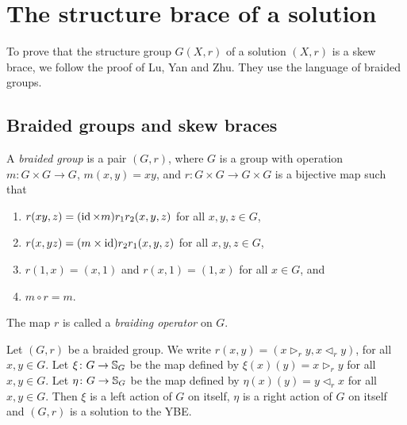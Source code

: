 \chapter{The structure brace of a solution}
\label{structure_brace}


To prove that the structure group $G(X,r)$ of a solution $(X,r)$ is a skew brace, we follow the 
proof of Lu, Yan and Zhu. They use the language of braided groups.

\section{Braided groups and skew braces}

\begin{definition}\label{braidedgroup}
A \emph{braided group} is a pair $(G,r)$, where 
$G$ is a group with operation $m\colon G\times G\to G$, $m(x,y)=xy$, and 
$r\colon G\times G\to G\times G$ is a bijective map such that
\begin{enumerate}
\item $r(xy,z)=(\operatorname{id}\times m)r_1r_2(x,y,z)$ for all $x,y,z\in G$,
\item $r(x,yz)=(m\times\operatorname{id})r_2r_1(x,y,z)$ for all $x,y,z\in G$,
\item $r(1,x)=(x,1)$ and $r(x,1)=(1,x)$ for all $x\in G$, and 
\item $m\circ r=m$.
\end{enumerate}
The map $r$ is called a \emph{braiding operator} on $G$. 
\end{definition}

\begin{lemma}
\label{lem:braidedsolYBE}
Let $(G,r)$ be a braided group. We write $r(x,y)=(x\rhd_r y,x\lhd_r y)$, for all $x,y\in G$. Let $\xi\colon G\rightarrow \mathbb{S}_G$ be the map defined by $\xi(x)(y)=x\rhd_r y$ for all $x,y\in G$. Let $\eta\colon G\rightarrow \mathbb{S}_G$ be the map defined by $\eta(x)(y)=y\lhd_r x$ for all $x,y\in G$. Then $\xi$ is a left action of $G$ on itself, $\eta$ is a right action of $G$ on itself and $(G,r)$ is a solution to the YBE. 
\end{lemma}


